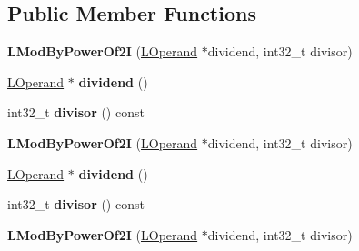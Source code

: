 \subsection*{Public Member Functions}
\begin{DoxyCompactItemize}
\item 
{\bfseries L\+Mod\+By\+Power\+Of2I} (\hyperlink{classv8_1_1internal_1_1_l_operand}{L\+Operand} $\ast$dividend, int32\+\_\+t divisor)\hypertarget{classv8_1_1internal_1_1_l_mod_by_power_of2_i_ae24bf80084199df5a60259d7c07cdcbf}{}\label{classv8_1_1internal_1_1_l_mod_by_power_of2_i_ae24bf80084199df5a60259d7c07cdcbf}

\item 
\hyperlink{classv8_1_1internal_1_1_l_operand}{L\+Operand} $\ast$ {\bfseries dividend} ()\hypertarget{classv8_1_1internal_1_1_l_mod_by_power_of2_i_ac13f14bd9208161205a94315c67fab0c}{}\label{classv8_1_1internal_1_1_l_mod_by_power_of2_i_ac13f14bd9208161205a94315c67fab0c}

\item 
int32\+\_\+t {\bfseries divisor} () const \hypertarget{classv8_1_1internal_1_1_l_mod_by_power_of2_i_a9edbee4d9db4a80578d3182db42ecd95}{}\label{classv8_1_1internal_1_1_l_mod_by_power_of2_i_a9edbee4d9db4a80578d3182db42ecd95}

\item 
{\bfseries L\+Mod\+By\+Power\+Of2I} (\hyperlink{classv8_1_1internal_1_1_l_operand}{L\+Operand} $\ast$dividend, int32\+\_\+t divisor)\hypertarget{classv8_1_1internal_1_1_l_mod_by_power_of2_i_ae24bf80084199df5a60259d7c07cdcbf}{}\label{classv8_1_1internal_1_1_l_mod_by_power_of2_i_ae24bf80084199df5a60259d7c07cdcbf}

\item 
\hyperlink{classv8_1_1internal_1_1_l_operand}{L\+Operand} $\ast$ {\bfseries dividend} ()\hypertarget{classv8_1_1internal_1_1_l_mod_by_power_of2_i_ac13f14bd9208161205a94315c67fab0c}{}\label{classv8_1_1internal_1_1_l_mod_by_power_of2_i_ac13f14bd9208161205a94315c67fab0c}

\item 
int32\+\_\+t {\bfseries divisor} () const \hypertarget{classv8_1_1internal_1_1_l_mod_by_power_of2_i_a9edbee4d9db4a80578d3182db42ecd95}{}\label{classv8_1_1internal_1_1_l_mod_by_power_of2_i_a9edbee4d9db4a80578d3182db42ecd95}

\item 
{\bfseries L\+Mod\+By\+Power\+Of2I} (\hyperlink{classv8_1_1internal_1_1_l_operand}{L\+Operand} $\ast$dividend, int32\+\_\+t divisor)\hypertarget{classv8_1_1internal_1_1_l_mod_by_power_of2_i_ae24bf80084199df5a60259d7c07cdcbf}{}\label{classv8_1_1internal_1_1_l_mod_by_power_of2_i_ae24bf80084199df5a60259d7c07cdcbf}


\end{DoxyCompactItemize}

